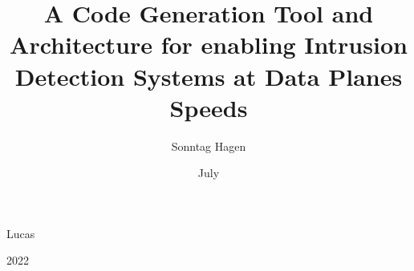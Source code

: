 

\title{A Code Generation Tool and Architecture for enabling Intrusion Detection Systems at Data Planes Speeds}
\author{Sonntag Hagen}{Lucas}
\date{July}{2022}




\maketitle













